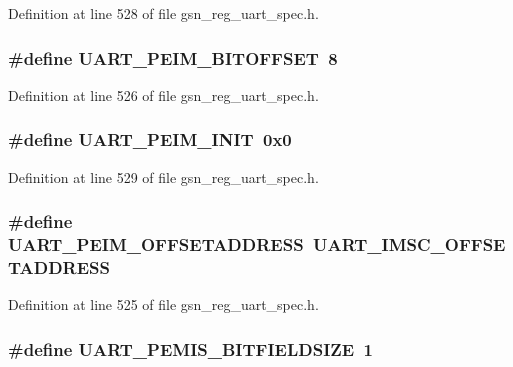Definition at line 528 of file gsn\_\-reg\_\-uart\_\-spec.h.

\hypertarget{a00575_abad339bf5195301abf45333dbbb9744b}{
\subsubsection[{UART\_\-PEIM\_\-BITOFFSET}]{\setlength{\rightskip}{0pt plus 5cm}\#define UART\_\-PEIM\_\-BITOFFSET~8}}
\label{a00575_abad339bf5195301abf45333dbbb9744b}


Definition at line 526 of file gsn\_\-reg\_\-uart\_\-spec.h.

\hypertarget{a00575_ab691f12bfd371bdb909285742c7cafb7}{
\subsubsection[{UART\_\-PEIM\_\-INIT}]{\setlength{\rightskip}{0pt plus 5cm}\#define UART\_\-PEIM\_\-INIT~0x0}}
\label{a00575_ab691f12bfd371bdb909285742c7cafb7}


Definition at line 529 of file gsn\_\-reg\_\-uart\_\-spec.h.

\hypertarget{a00575_a5aad26db88b1c2344c145e709b57bcc1}{
\subsubsection[{UART\_\-PEIM\_\-OFFSETADDRESS}]{\setlength{\rightskip}{0pt plus 5cm}\#define UART\_\-PEIM\_\-OFFSETADDRESS~UART\_\-IMSC\_\-OFFSETADDRESS}}
\label{a00575_a5aad26db88b1c2344c145e709b57bcc1}


Definition at line 525 of file gsn\_\-reg\_\-uart\_\-spec.h.

\hypertarget{a00575_ab9fa7f3efae8b0d4fb078ab836e692c0}{
\subsubsection[{UART\_\-PEMIS\_\-BITFIELDSIZE}]{\setlength{\rightskip}{0pt plus 5cm}\#define UART\_\-PEMIS\_\-BITFIELDSIZE~1}}
\label{a00575_ab9fa7f3efae8b0d4fb078ab836e692c0}


